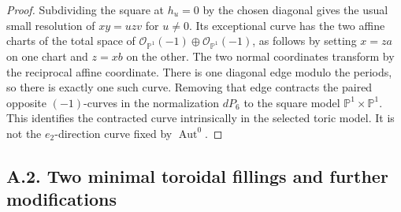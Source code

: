 \begin{proof}
Subdividing the square at $h_u=0$ by the chosen diagonal gives
the usual small resolution of $xy=uzv$ for $u\ne0$. Its exceptional
curve has the two affine charts of the total space of
$\mathcal O_{\mathbb P^1}(-1)\oplus
\mathcal O_{\mathbb P^1}(-1)$, as follows by setting $x=za$ on
one chart and $z=xb$ on the other. The two normal coordinates
transform by the reciprocal affine coordinate. There is one
diagonal edge modulo the periods, so there is exactly one such
curve. Removing that edge contracts the paired opposite
$(-1)$-curves in the normalization $dP_6$ to the square model
$\mathbb P^1\times\mathbb P^1$. This identifies the contracted
curve intrinsically in the selected toric model. It is not the
$e_2$-direction curve fixed by $\operatorname{Aut}^0$.
\end{proof}

\subsection{A.2. Two minimal toroidal fillings and further modifications}

